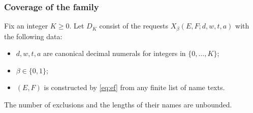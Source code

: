 \documentclass[11pt,twoside]{article}
\theoremstyle{definition}
\begin{document}
\subsubsection{Coverage of the family}

Fix an integer $K\ge0$. Let $D_K$ consist of the requests
$X_{\beta}(E,F;d,w,t,a)$ with the following data:
\begin{itemize}[leftmargin=*]
\item $d,w,t,a$ are canonical decimal numerals for integers in $\{0,\ldots,K\}$;
\item $\beta\in\{0,1\}$;
\item $(E,F)$ is constructed by \cref{eq:ef} from any finite list of name texts.
\end{itemize}
The number of exclusions and the lengths of their names are unbounded.
\end{document}
